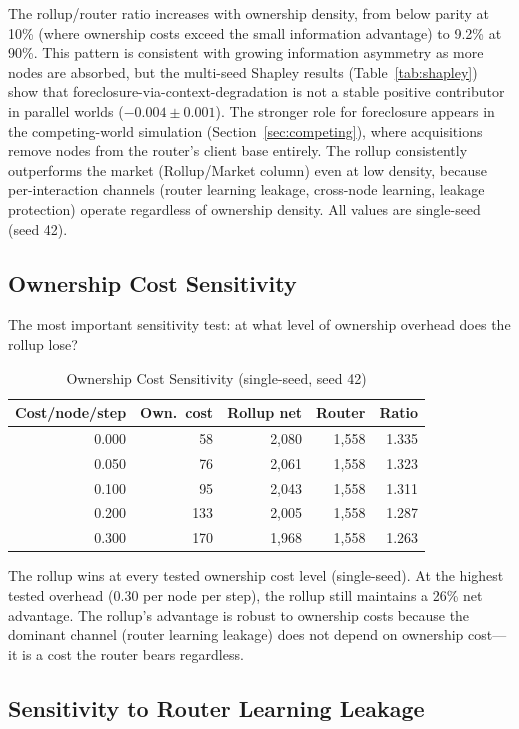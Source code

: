 \documentclass[12pt]{article}
\theoremstyle{definition}
\begin{document}
The rollup/router ratio increases with ownership density, from below parity at 10\% (where ownership costs exceed the small information advantage) to 9.2\% at 90\%. This pattern is consistent with growing information asymmetry as more nodes are absorbed, but the multi-seed Shapley results (Table~\ref{tab:shapley}) show that foreclosure-via-context-degradation is not a stable positive contributor in parallel worlds ($-0.004 \pm 0.001$). The stronger role for foreclosure appears in the competing-world simulation (Section~\ref{sec:competing}), where acquisitions remove nodes from the router's client base entirely. The rollup consistently outperforms the market (Rollup/Market column) even at low density, because per-interaction channels (router learning leakage, cross-node learning, leakage protection) operate regardless of ownership density. All values are single-seed (seed 42).

\subsection{Ownership Cost Sensitivity}

The most important sensitivity test: at what level of ownership overhead does the rollup lose?

\begin{table}[H]
\centering
\caption{Ownership Cost Sensitivity (single-seed, seed 42)}
\label{tab:costbreak}
\begin{tabular}{rrrrr}
\toprule
Cost/node/step & Own.\ cost & Rollup net & Router & Ratio \\
\midrule
0.000 & 58 & 2,080 & 1,558 & 1.335 \\
0.050 & 76 & 2,061 & 1,558 & 1.323 \\
0.100 & 95 & 2,043 & 1,558 & 1.311 \\
0.200 & 133 & 2,005 & 1,558 & 1.287 \\
0.300 & 170 & 1,968 & 1,558 & 1.263 \\
\bottomrule
\end{tabular}
\end{table}

The rollup wins at every tested ownership cost level (single-seed). At the highest tested overhead (0.30 per node per step), the rollup still maintains a 26\% net advantage. The rollup's advantage is robust to ownership costs because the dominant channel (router learning leakage) does not depend on ownership cost---it is a cost the router bears regardless.

\subsection{Sensitivity to Router Learning Leakage}
\end{document}
